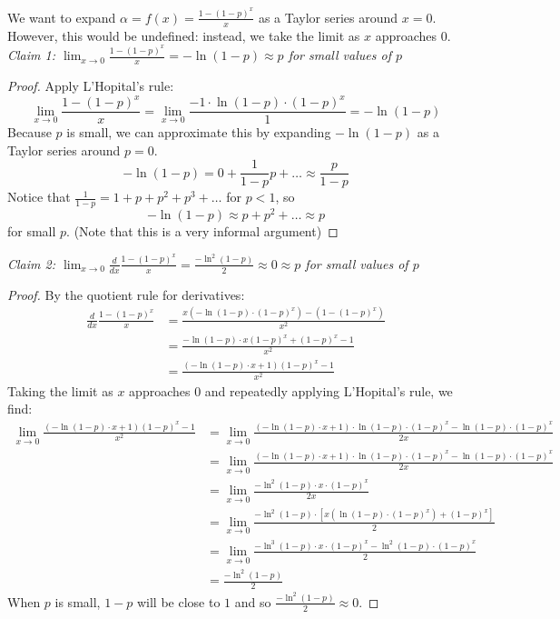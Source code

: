 \documentclass[12pt]{article}
\begin{document}
We want to expand $\alpha = f(x) = \frac{1 - (1-p)^{x}}{x}$ as a Taylor series around $x = 0$. However, this would be undefined: instead, we take the limit as $x$ approaches $0$.\\

\textit{Claim 1: $\lim_{x \to 0} \frac{1-(1-p)^x}{x} = -\ln(1-p) \approx p$ for small values of $p$}
\begin{proof}
Apply L'Hopital's rule:
$$\lim_{x \to 0} \frac{1-(1-p)^x}{x} = \lim_{x \to 0} \frac{-1 \cdot \ln(1-p) \cdot (1-p)^x}{1} = - \ln(1-p)$$
Because $p$ is small, we can approximate this by expanding $-\ln(1-p)$ as a Taylor series around $p = 0$.
$$-\ln(1-p) = 0 + \frac{1}{1-p}p + \hdots \approx \frac{p}{1-p}$$
Notice that $\frac{1}{1-p} = 1 + p + p^2 + p^3 + \hdots$ for $p < 1$, so $$-\ln(1-p) \approx p + p^2 + \hdots \approx p$$ for small $p$. (Note that this is a very informal argument)
\end{proof}


\textit{Claim 2: $\lim_{x \to 0} \frac{d}{dx} \frac{1-(1-p)^x}{x} = \frac{-\ln^2 (1-p)}{2} \approx 0 \approx p$ for small values of $p$}
\begin{proof}
By the quotient rule for derivatives:
\begin{align*}
\frac{d}{dx} \frac{1 - (1-p)^x}{x} &= \frac{x(-\ln(1-p) \cdot (1-p)^x) - (1-(1-p)^x)}{x^2}\\
&= \frac{-\ln(1-p) \cdot x(1-p)^x + (1-p)^x - 1}{
x^2}\\
&= \frac{(-\ln(1-p) \cdot x + 1 )(1-p)^x - 1}{x^2}
\end{align*}
Taking the limit as $x$ approaches $0$ and repeatedly applying L'Hopital's rule, we find:
\begin{align*}
\lim_{x \to 0}
\frac{(-\ln(1-p) \cdot x + 1 )(1-p)^x - 1}{x^2}
&=\lim_{x \to 0} \frac{(-\ln(1-p) \cdot x + 1)\cdot \ln(1-p) \cdot (1-p)^x - \ln(1-p) \cdot (1-p)^x}{2x}\\
&= \lim_{x \to 0}\frac{(-\ln(1-p) \cdot x + 1)\cdot \ln(1-p) \cdot (1-p)^x - \ln(1-p) \cdot (1-p)^x}{2x}\\
&= \lim_{x \to 0}\frac{-\ln^2(1-p) \cdot x \cdot (1-p)^x}{2x}\\
&= \lim_{x \to 0} \frac{-\ln^2(1-p) \cdot [x (\ln(1-p) \cdot (1-p)^x) + (1-p)^x]}{2}\\
&= \lim_{x \to 0} \frac{-\ln^3(1-p) \cdot x \cdot (1-p)^x - \ln^2(1-p) \cdot (1-p)^x}{2}\\
&= \frac{-\ln^2(1-p)}{2}
\end{align*}
When $p$ is small, $1 - p$ will be close to $1$ and so $\frac{-\ln^2(1-p)}{2} \approx 0$. 
\end{proof}
\end{document}
